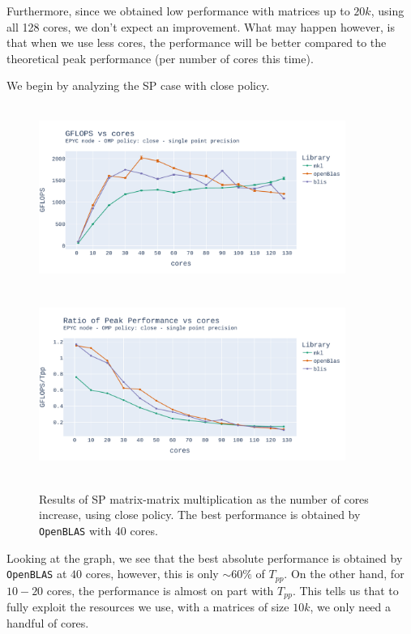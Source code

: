 \documentclass{report}
\begin{document}
Furthermore, since we obtained low performance with matrices up to $20k$, using 
all 128 cores, we don't expect an improvement. What may happen however,
is that when we use less cores, the performance will be better compared 
to the theoretical peak performance (per number of cores this time).

We begin by analyzing the SP case with close policy.

\begin{figure}[H]
\hspace*{-2.5cm}
\includegraphics[width=10cm, height=6cm]{./images/fixed_size_epyc_float_gflops_close.pdf}
\includegraphics[width=10cm, height=6cm]{./images/fixed_size_epyc_float_gflops_close_ratio.pdf}
\caption{\label{fig:fixed_size_epyc_float_close} Results of SP matrix-matrix multiplication 
as the number of cores increase, using close policy. The best performance is obtained 
by \texttt{OpenBLAS} with 40 cores.}
\end{figure}

Looking at the graph, we see that the best absolute performance is obtained by 
\texttt{OpenBLAS} at $40$ cores, however, this is only $\sim60\%$ of $T_{pp}$. 
On the other hand, for $10-20$ cores, the performance is almost on part with $T_{pp}$. 
This tells us that to fully exploit the resources we use, with a matrices of size 
$10k$, we only need a handful of cores.
\end{document}
